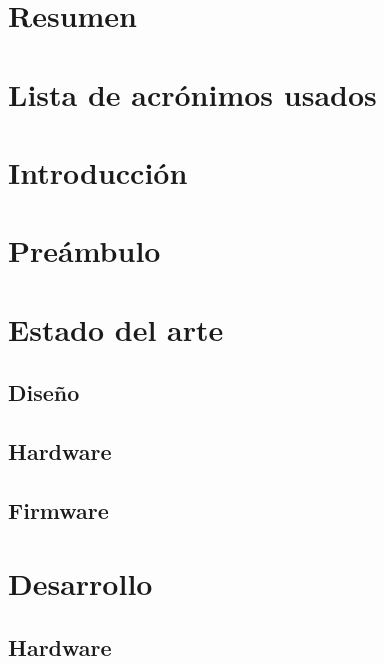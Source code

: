 


  


  \chapter*{Resumen}
    

  \chapter*{Lista de acrónimos usados}
    


  \tableofcontents \label{chapter:contents}


  \chapter{Introducción}
    
    

  \chapter{Preámbulo}
    


  \chapter{Estado del arte}
    \section{Diseño}
      
      \newpage

    \section{Hardware}
      
      \newpage

    \section{Firmware}
      


  \chapter{Desarrollo}
    \section{Hardware}
      
      \newpage

